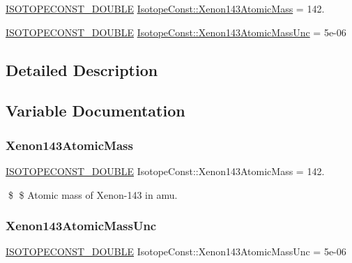 \begin{DoxyCompactItemize}
\item 
\mbox{\hyperlink{group___isotope_const-_macros_ga8f45a7272ce02c0b4c65c44636ed719a}{I\+S\+O\+T\+O\+P\+E\+C\+O\+N\+S\+T\+\_\+\+D\+O\+U\+B\+LE}} \mbox{\hyperlink{group___isotope_const-_xenon-_xe143_ga8f75a223905a5c868fc4cdc8aee66bf8}{Isotope\+Const\+::\+Xenon143\+Atomic\+Mass}} = 142.
\item 
\mbox{\hyperlink{group___isotope_const-_macros_ga8f45a7272ce02c0b4c65c44636ed719a}{I\+S\+O\+T\+O\+P\+E\+C\+O\+N\+S\+T\+\_\+\+D\+O\+U\+B\+LE}} \mbox{\hyperlink{group___isotope_const-_xenon-_xe143_ga03eed50ea2aaae2b51e8ae239356105f}{Isotope\+Const\+::\+Xenon143\+Atomic\+Mass\+Unc}} = 5e-\/06
\end{DoxyCompactItemize}


\subsection{Detailed Description}


\subsection{Variable Documentation}
\mbox{\label{group___isotope_const-_xenon-_xe143_ga8f75a223905a5c868fc4cdc8aee66bf8}} 
\subsubsection{\texorpdfstring{Xenon143\+Atomic\+Mass}{Xenon143AtomicMass}}
{\footnotesize\ttfamily \mbox{\hyperlink{group___isotope_const-_macros_ga8f45a7272ce02c0b4c65c44636ed719a}{I\+S\+O\+T\+O\+P\+E\+C\+O\+N\+S\+T\+\_\+\+D\+O\+U\+B\+LE}} Isotope\+Const\+::\+Xenon143\+Atomic\+Mass = 142.}

\$ \$ Atomic mass of Xenon-\/143 in amu. \mbox{\label{group___isotope_const-_xenon-_xe143_ga03eed50ea2aaae2b51e8ae239356105f}} 
\subsubsection{\texorpdfstring{Xenon143\+Atomic\+Mass\+Unc}{Xenon143AtomicMassUnc}}
{\footnotesize\ttfamily \mbox{\hyperlink{group___isotope_const-_macros_ga8f45a7272ce02c0b4c65c44636ed719a}{I\+S\+O\+T\+O\+P\+E\+C\+O\+N\+S\+T\+\_\+\+D\+O\+U\+B\+LE}} Isotope\+Const\+::\+Xenon143\+Atomic\+Mass\+Unc = 5e-\/06}

